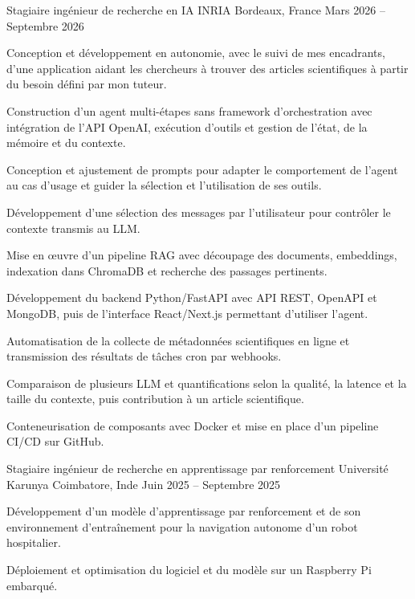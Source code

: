 
\begin{cventries}
  \cventry
    {Stagiaire ingénieur de recherche en IA}
    {INRIA}
    {Bordeaux, France}
    {Mars 2026 -- Septembre 2026}
    {
      \begin{cvitems}
        \item {Conception et développement en autonomie, avec le suivi de mes encadrants, d’une application aidant les chercheurs à trouver des articles scientifiques à partir du besoin défini par mon tuteur.}
        \item {Construction d’un agent multi-étapes sans framework d’orchestration avec intégration de l’API OpenAI, exécution d’outils et gestion de l’état, de la mémoire et du contexte.}
        \item {Conception et ajustement de prompts pour adapter le comportement de l’agent au cas d’usage et guider la sélection et l’utilisation de ses outils.}
        \item {Développement d’une sélection des messages par l’utilisateur pour contrôler le contexte transmis au LLM.}
        \item {Mise en œuvre d’un pipeline RAG avec découpage des documents, embeddings, indexation dans ChromaDB et recherche des passages pertinents.}
        \item {Développement du backend Python/FastAPI avec API REST, OpenAPI et MongoDB, puis de l’interface React/Next.js permettant d’utiliser l’agent.}
        \item {Automatisation de la collecte de métadonnées scientifiques en ligne et transmission des résultats de tâches cron par webhooks.}
        \item {Comparaison de plusieurs LLM et quantifications selon la qualité, la latence et la taille du contexte, puis contribution à un article scientifique.}
        \item {Conteneurisation de composants avec Docker et mise en place d’un pipeline CI/CD sur GitHub.}
      \end{cvitems}
    }

  \cventry
    {Stagiaire ingénieur de recherche en apprentissage par renforcement}
    {Université Karunya}
    {Coimbatore, Inde}
    {Juin 2025 -- Septembre 2025}
    {
      \begin{cvitems}
        \item {Développement d’un modèle d’apprentissage par renforcement et de son environnement d’entraînement pour la navigation autonome d’un robot hospitalier.}
        \item {Déploiement et optimisation du logiciel et du modèle sur un Raspberry Pi embarqué.}
      \end{cvitems}
    }
\end{cventries}
